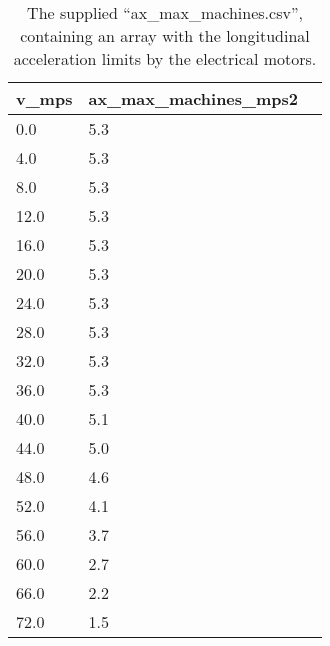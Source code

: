 \begin{table}[H]
    \centering
    \begin{tabular}{|l|l|l|}
        \hline
        \textbf{v\_mps} & \textbf{ax\_max\_machines\_mps2} \\ \hline
        0.0             & 5.3                              \\ \hline
        4.0             & 5.3                              \\ \hline
        8.0             & 5.3                              \\ \hline
        12.0            & 5.3                              \\ \hline
        16.0            & 5.3                              \\ \hline
        20.0            & 5.3                              \\ \hline
        24.0            & 5.3                              \\ \hline
        28.0            & 5.3                              \\ \hline
        32.0            & 5.3                              \\ \hline
        36.0            & 5.3                              \\ \hline
        40.0            & 5.1                              \\ \hline
        44.0            & 5.0                              \\ \hline
        48.0            & 4.6                              \\ \hline
        52.0            & 4.1                              \\ \hline
        56.0            & 3.7                              \\ \hline
        60.0            & 2.7                              \\ \hline
        66.0            & 2.2                              \\ \hline
        72.0            & 1.5                              \\ \hline
    \end{tabular}
    \caption{The supplied ``ax\_max\_machines.csv'', containing an array with the longitudinal acceleration limits by the electrical motors.}
    \label{tab:Ax Machines Array}
\end{table}

